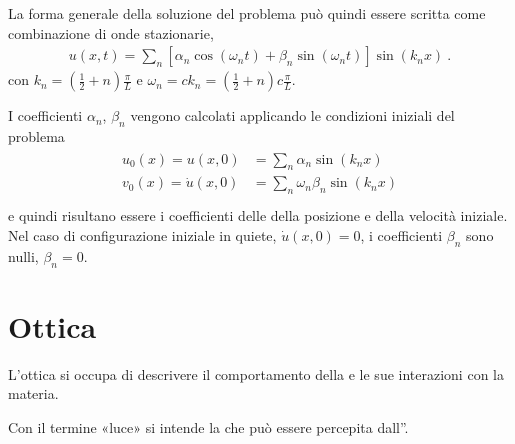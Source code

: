 \documentclass[letterpaper,10pt,italian]{jupyterBook}
\begin{document}
\sphinxAtStartPar
La forma generale della soluzione del problema può quindi essere scritta come combinazione di onde stazionarie,
\begin{equation*}
\begin{split}u(x,t) = \sum_{n} \left[ \alpha_n \cos\left( \omega_n t \right) + \beta_n \sin\left(\omega_n t\right) \right] \sin\left( k_n x \right) \ .\end{split}
\end{equation*}
\sphinxAtStartPar
con \(k_n = \left(\frac{1}{2}+n\right)\frac{\pi}{L}\) e \(\omega_n = c k_n = \left( \frac{1}{2} + n \right) c \frac{\pi}{L}\).

\sphinxAtStartPar
I coefficienti \(\alpha_n\), \(\beta_n\) vengono calcolati applicando le condizioni iniziali del problema
\begin{equation*}
\begin{split}\begin{aligned}
  u_0(x) = u(x,0)       & = \sum_{n} \alpha_n  \sin\left( k_n x \right) \\
  v_0(x) = \dot{u}(x,0) & = \sum_{n} \omega_n \beta_n  \sin\left( k_n x \right) \\
\end{aligned}\end{split}
\end{equation*}
\sphinxAtStartPar
e quindi risultano essere i coefficienti delle  della posizione e della velocità iniziale. Nel caso di configurazione iniziale in quiete, \(\dot{u}(x,0) = 0\), i coefficienti \(\beta_n\) sono nulli, \(\beta_n = 0\).


\subsection{}
\label{\detokenize{ch/waves/waves-notes:id1}}
\sphinxstepscope


\chapter{Ottica}
\label{\detokenize{ch/waves/optics:ottica}}\label{\detokenize{ch/waves/optics:physics-hs-waves-optics}}\label{\detokenize{ch/waves/optics::doc}}
\sphinxAtStartPar
L’ottica si occupa di descrivere il comportamento della  e le sue interazioni con la materia.

\sphinxAtStartPar
{} Con il termine «luce» si intende la {\hyperref[\detokenize{ch/electromagnetism/em-waves:physics-hs-electromagnetism-em-waves}]{}} che può essere percepita dall”{\hyperref[\detokenize{ch/waves/optics-eye:physics-hs-waves-optics-eye}]{}}.
\end{document}
